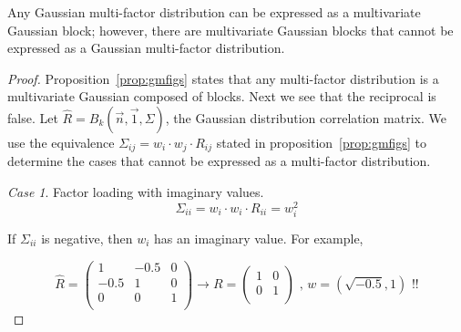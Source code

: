 \documentclass[11pt,fleqn]{book} %
\begin{document}
\begin{proposition}
	\label{prop:ibne}
	Any Gaussian multi-factor distribution can be expressed as a multivariate 
	Gaussian block; however, there are multivariate Gaussian blocks that cannot be 
	expressed as a Gaussian multi-factor distribution.
\end{proposition}
\begin{proof}
	Proposition~\ref{prop:gmfigs} states that any multi-factor distribution 
	is a multivariate Gaussian composed of blocks.
	Next we see that the reciprocal is false. Let 
	$\widehat{R} = B_k(\vec{n},\vec{1},\Sigma)$, the Gaussian distribution 
	correlation matrix. We use the equivalence 
	$\Sigma_{ij} = w_i \cdot w_j \cdot R_{ij}$ stated in 
	proposition~\ref{prop:gmfigs} to determine the cases that cannot be 
	expressed as a multi-factor distribution.

	\emph{Case 1}. Factor loading with imaginary values.
	\begin{displaymath}
		\Sigma_{ii} = w_i \cdot w_i \cdot R_{ii} = w_i^2
	\end{displaymath}
	\begin{adjustwidth}{1cm}{0pt}
		If $\Sigma_{ii}$ is negative, then $w_i$ has an imaginary value.
		For example,
	\end{adjustwidth}
	\begin{displaymath}
		\widehat{R} = \left(
		\begin{array}{cc|c}
			1    & -0.5 & 0 \\
			-0.5 & 1    & 0 \\
			\hline
			0    & 0    & 1 \\
		\end{array}
		\right) 
		\longrightarrow
		R = \left(
		\begin{array}{cc}
			1 & 0 \\
			0 & 1 \\
		\end{array}
		\right)
		\text{ , }
		w = (\sqrt{-0.5}, 1)
		\text{ !!}
	\end{displaymath}
	

\end{proof}
\end{document}
